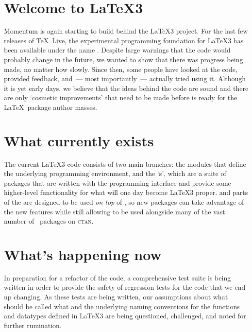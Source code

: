 \documentclass{ltnews}
\begin{document}
\maketitle

\section{Welcome to \LaTeX3}

Momentum is again starting to build behind the \LaTeX3 project. For the
last few releases of \TeX~Live, the experimental programming foundation for
\LaTeX3 has been available under the name . Despite large
warnings that the code would probably change in the future, we wanted to show
that there was progress being made, no matter how slowly. Since then, some
people have looked at the code, provided feedback, and~--- most
importantly~--- actually tried using it. Although it is yet early days, we
believe that the ideas behind the code are sound and there are only `cosmetic
improvements' that need to be made before  is ready for the
\LaTeX~package author masses.

\section{What currently exists}

The current \LaTeX3 code consists of two main branches: the
 modules that define the underlying programming environment,
and the `s', which are a suite of packages that are written
with the  programming interface and provide some higher-level
functionality for what will one day become \LaTeX3 proper.  and
parts of the  are designed to be used \emph{on top} of
\LaTeXe, so new packages can take advantage of the new features while still
allowing to be used alongside many of the vast number of \LaTeXe\ packages on 
\textsc{ctan}.

\section{What's happening now}

In preparation for a refactor of the  code, a comprehensive
test suite is being written in order to provide the safety of regression tests
for the code that we end up changing. As these tests are being written, our
assumptions about what should be called what and the underlying naming
conventions for the functions and datatypes defined in \LaTeX3 are being
questioned, challenged, and noted for further rumination.
\end{document}
